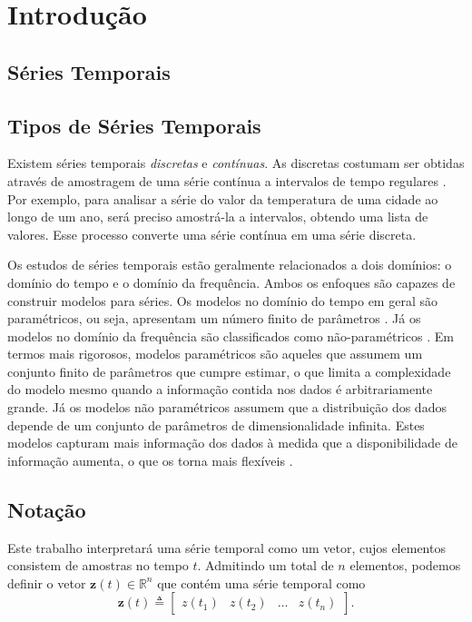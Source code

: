 \section{Introdução}

 \subsection{Séries Temporais}
 \label{sec:SeriesTemporais}
 \subsection{Tipos de Séries Temporais}
 Existem séries temporais \textit{discretas} e \textit{contínuas}. As discretas costumam ser obtidas através de amostragem de uma série contínua a intervalos de tempo regulares \cite{morettin2006analise,hyndman2018forecasting}. Por exemplo, para analisar a série do valor da temperatura de uma cidade ao longo de um ano, será preciso amostrá-la a intervalos, obtendo uma lista de valores. Esse processo converte uma série contínua em uma série discreta.

Os estudos de séries temporais estão geralmente relacionados a dois domínios: o domínio do tempo e o domínio da frequência. Ambos os enfoques são capazes de construir modelos para séries. Os modelos no domínio do tempo em geral são paramétricos, ou seja, apresentam um número finito de parâmetros \cite{conover1981rank}. Já os modelos no domínio da frequência são classificados como não-paramétricos \cite{hollander1999nonparametric}. Em termos mais rigorosos, modelos paramétricos são aqueles que assumem um conjunto finito de parâmetros que cumpre estimar, o que limita a complexidade do modelo mesmo quando a informação contida nos dados é arbitrariamente grande. Já os modelos não paramétricos assumem que a distribuição dos dados depende de um conjunto de parâmetros de dimensionalidade infinita. Estes modelos capturam mais informação dos dados à medida que a disponibilidade de informação aumenta, o que os torna mais flexíveis \cite{ChenNeural2001}.
 
\subsection{Notação}
Este trabalho interpretará uma série temporal como um vetor, cujos elementos consistem de amostras no tempo $t$. Admitindo um total de $n$ elementos, podemos definir o vetor $\boldsymbol{z}(t) \in \mathbb{R}^n$ que contém uma série temporal como
\begin{equation}
\boldsymbol{z}(t) \triangleq \begin{bmatrix}z(t_1) & z(t_2) & \ldots & z(t_n)\end{bmatrix}.
\end{equation}
 

